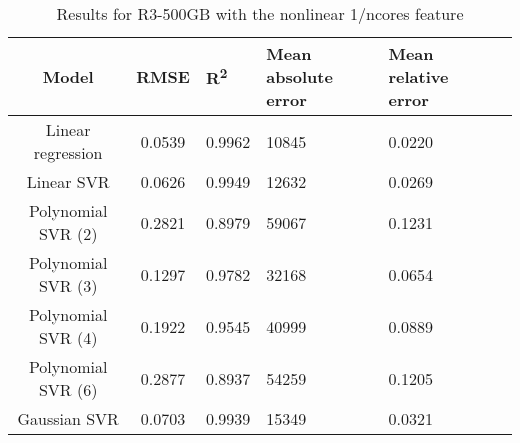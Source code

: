 \begin{table}[H]
\centering
\begin{adjustbox}{center}
\begin{tabular}{c | c M{1.2cm} M{2.5cm} M{2.5cm} M{1.8cm}}
Model & RMSE & R\textsuperscript{2} & Mean absolute error & Mean relative error \tabularnewline
\hline
Linear regression & 0.0539 & 0.9962 &  10845 & 0.0220 \\
Linear SVR & 0.0626 & 0.9949 &  12632 & 0.0269 \\
Polynomial SVR (2) & 0.2821 & 0.8979 &  59067 & 0.1231 \\
Polynomial SVR (3) & 0.1297 & 0.9782 &  32168 & 0.0654 \\
Polynomial SVR (4) & 0.1922 & 0.9545 &  40999 & 0.0889 \\
Polynomial SVR (6) & 0.2877 & 0.8937 &  54259 & 0.1205 \\
Gaussian SVR & 0.0703 & 0.9939 &  15349 & 0.0321 \\
\end{tabular}
\end{adjustbox}
\\
\caption{Results for R3-500GB with the nonlinear 1/ncores feature}
\label{tab:all_nonlinear_R3_500}
\end{table}
